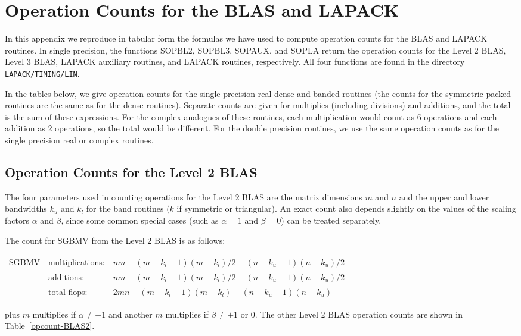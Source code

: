 \chapter{Operation Counts for the BLAS and LAPACK}
In this appendix we reproduce in tabular form the formulas we have
used to compute operation counts for the BLAS and LAPACK routines.
In single precision, the functions
SOPBL2, SOPBL3, SOPAUX, and SOPLA return the operation counts for the
Level 2 BLAS, Level 3 BLAS, LAPACK auxiliary routines, and LAPACK
routines, respectively.  All four functions are found
in the directory {\tt LAPACK/TIMING/LIN}.

In the tables below, we give operation counts for the single precision 
real dense and banded routines (the counts for the symmetric
packed routines are the same as for the dense routines). 
Separate counts are given for multiplies (including divisions)
and additions, and the total is the sum of these expressions.
For the complex analogues of these routines, each multiplication
would count as 6 operations and each addition as 2 operations, so the
total would be different. 
For the double precision routines, we use the same operation counts
as for the single precision real or complex routines.

\section*{Operation Counts for the Level 2 BLAS}
\dent
The four parameters used in counting operations for the Level 2 BLAS
are the matrix dimensions $m$ and $n$ and the upper and lower
bandwidths $k_u$ and $k_l$ for the band routines ($k$ if symmetric
or triangular).  An exact count also depends slightly on the
values of the scaling factors $\alpha$ and $\beta$, since some
common special cases (such as $\alpha = 1$ and $\beta = 0$) can
be treated separately.

The count for SGBMV from the Level 2 BLAS is as follows:
\begin{flushleft}\begin{tabular}{@{} p{4.5em} l l }
SGBMV
 & multiplications: & $ m n - (m-k_l-1)(m-k_l)/2  - (n-k_u-1)(n-k_u)/2 $ \\
 & additions:  & $ m n - (m-k_l-1)(m-k_l)/2  - (n-k_u-1)(n-k_u)/2 $ \\ \cline{2-3}
 & total flops: & $ 2 m n - (m-k_l-1)(m-k_l) - (n-k_u-1)(n-k_u) $
\end{tabular}\end{flushleft}
\noindent
plus $m$ multiplies if $\alpha \neq \pm 1 $ and another $m$
multiplies if $\beta \neq \pm 1$ or $0$. 
The other Level 2 BLAS operation counts are shown in
Table~\ref{opcount-BLAS2}.

